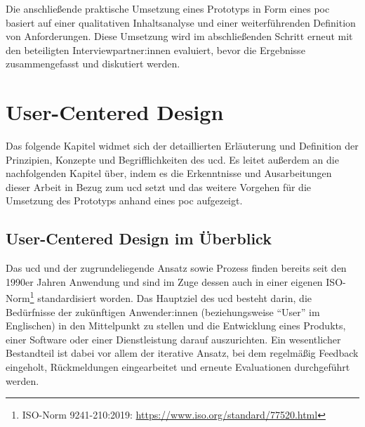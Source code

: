 \documentclass[a4paper,12pt,twoside,numbers=noendperiod]{scrreprt}
\begin{document}
Die anschließende praktische Umsetzung eines Prototyps in Form eines \acl{poc} basiert auf einer qualitativen Inhaltsanalyse und einer weiterführenden Definition von Anforderungen. Diese Umsetzung wird im abschließenden Schritt erneut mit den beteiligten Interviewpartner:innen evaluiert, bevor die Ergebnisse zusammengefasst und diskutiert werden.

\cleardoublepage
\chapter{User-Centered Design}
\label{chap:user-centered-design}

Das folgende Kapitel widmet sich der detaillierten Erläuterung und Definition der Prinzipien, Konzepte und Begrifflichkeiten des \ac{ucd}. Es leitet außerdem an die nachfolgenden Kapitel über, indem es die Erkenntnisse und Ausarbeitungen dieser Arbeit in Bezug zum \acl{ucd} setzt und das weitere Vorgehen für die Umsetzung des Prototyps anhand eines \ac{poc} aufgezeigt.

\section{User-Centered Design im Überblick}
\label{sec:überblick-ucd}

Das \ac{ucd} und der zugrundeliegende Ansatz sowie Prozess finden bereits seit den 1990er Jahren Anwendung und sind im Zuge dessen auch in einer eigenen ISO-Norm\footnote{ISO-Norm 9241-210:2019: \url{https://www.iso.org/standard/77520.html}} standardisiert worden. Das Hauptziel des \ac{ucd} besteht darin, die Bedürfnisse der zukünftigen Anwender:innen (beziehungsweise \enquote{User} im Englischen) in den Mittelpunkt zu stellen und die Entwicklung eines Produkts, einer Software oder einer Dienstleistung darauf auszurichten. Ein wesentlicher Bestandteil ist dabei vor allem der iterative Ansatz, bei dem regelmäßig Feedback eingeholt, Rückmeldungen eingearbeitet und erneute Evaluationen durchgeführt werden. \cite{frieling_user_2019}

\medskip
\end{document}
